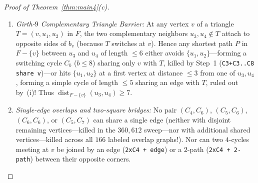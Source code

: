\documentclass[11pt,reqno]{amsart}
\theoremstyle{plain}
\theoremstyle{definition}
\theoremstyle{remark}
\DeclareRobustCommand{\_}{\ifmmode\text{\textunderscore}\else\textunderscore\allowbreak\fi}
\begin{document}
\begin{proof}[Proof of Theorem~\ref{thm:main4}(c)]
\begin{enumerate}[label=(\roman*),leftmargin=2em]
\begin{itemize}[leftmargin=1.4em]
  \end{itemize}
  \item \emph{Girth-$9$ Complementary Triangle Barrier:} At any vertex $v$ of a triangle $T = (v, u_1, u_2)$ in $F$, the two complementary neighbors $u_3, u_4 \notin T$ attach to opposite sides of $b_v$ (because $T$ switches at $v$). Hence any shortest path $P$ in $F - \{v\}$ between $u_3$ and $u_4$ of length $\le 6$ either avoids $\{u_1, u_2\}$---forming a switching cycle $C_b$ ($b \le 8$) sharing only $v$ with $T$, killed by Step~1 (\texttt{C3+C3..C8 share v})---or hits $\{u_1, u_2\}$ at a first vertex at distance $\le 3$ from one of $u_3, u_4$, forming a simple cycle of length $\le 5$ sharing an edge with $T$, ruled out by~(i)! Thus $\operatorname{dist}_{F - \{v\}}(u_3, u_4) \ge 7$.
  \item \emph{Single-edge overlaps and two-square bridges:} No pair $(C_4, C_6)$, $(C_5, C_6)$, $(C_6, C_6)$, or $(C_5, C_7)$ can share a single edge (neither with disjoint remaining vertices---killed in the $360{,}612$ sweep---nor with additional shared vertices---killed across all $166$ labeled overlap graphs!). Nor can two $4$-cycles meeting at $v$ be joined by an edge (\texttt{2xC4 + edge}) or a $2$-path (\texttt{2xC4 + 2-path}) between their opposite corners.
\end{enumerate}


\end{proof}
\end{document}
